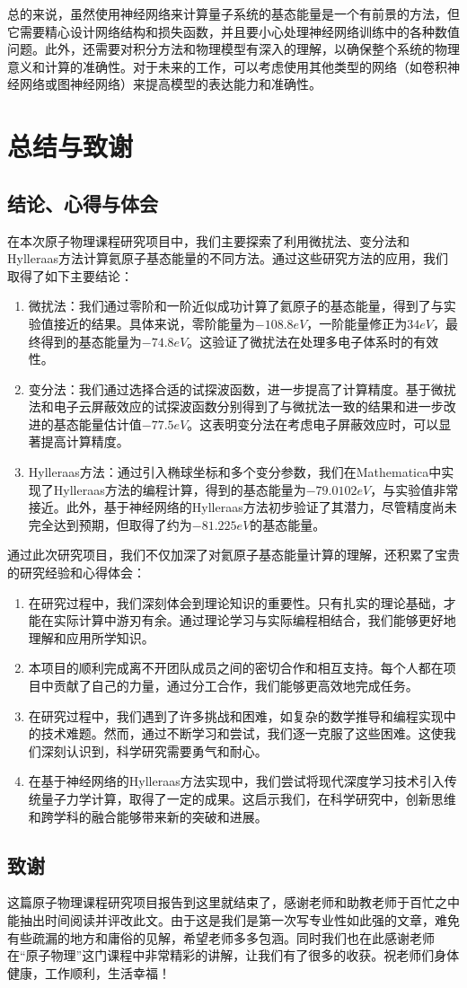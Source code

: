 总的来说，虽然使用神经网络来计算量子系统的基态能量是一个有前景的方法，但它需要精心设计网络结构和损失函数，并且要小心处理神经网络训练中的各种数值问题。此外，还需要对积分方法和物理模型有深入的理解，以确保整个系统的物理意义和计算的准确性。对于未来的工作，可以考虑使用其他类型的网络（如卷积神经网络或图神经网络）来提高模型的表达能力和准确性。

\section{总结与致谢}
\subsection{结论、心得与体会}
在本次原子物理课程研究项目中，我们主要探索了利用微扰法、变分法和Hylleraas方法计算氦原子基态能量的不同方法。通过这些研究方法的应用，我们取得了如下主要结论：
\begin{enumerate}
	\item 微扰法：我们通过零阶和一阶近似成功计算了氦原子的基态能量，得到了与实验值接近的结果。具体来说，零阶能量为$-108.8 eV$，一阶能量修正为$34 eV$，最终得到的基态能量为$-74.8 eV$。这验证了微扰法在处理多电子体系时的有效性。
	
	\item 变分法：我们通过选择合适的试探波函数，进一步提高了计算精度。基于微扰法和电子云屏蔽效应的试探波函数分别得到了与微扰法一致的结果和进一步改进的基态能量估计值$-77.5 eV$。这表明变分法在考虑电子屏蔽效应时，可以显著提高计算精度。
	
	\item Hylleraas方法：通过引入椭球坐标和多个变分参数，我们在Mathematica中实现了Hylleraas方法的编程计算，得到的基态能量为$-79.0102 eV$，与实验值非常接近。此外，基于神经网络的Hylleraas方法初步验证了其潜力，尽管精度尚未完全达到预期，但取得了约为$-81.225 eV$的基态能量。
\end{enumerate}

通过此次研究项目，我们不仅加深了对氦原子基态能量计算的理解，还积累了宝贵的研究经验和心得体会：	
\begin{enumerate}
	\item 在研究过程中，我们深刻体会到理论知识的重要性。只有扎实的理论基础，才能在实际计算中游刃有余。通过理论学习与实际编程相结合，我们能够更好地理解和应用所学知识。
	\item 本项目的顺利完成离不开团队成员之间的密切合作和相互支持。每个人都在项目中贡献了自己的力量，通过分工合作，我们能够更高效地完成任务。
	\item 在研究过程中，我们遇到了许多挑战和困难，如复杂的数学推导和编程实现中的技术难题。然而，通过不断学习和尝试，我们逐一克服了这些困难。这使我们深刻认识到，科学研究需要勇气和耐心。
	\item 在基于神经网络的Hylleraas方法实现中，我们尝试将现代深度学习技术引入传统量子力学计算，取得了一定的成果。这启示我们，在科学研究中，创新思维和跨学科的融合能够带来新的突破和进展。
\end{enumerate}

\subsection{致谢}
这篇原子物理课程研究项目报告到这里就结束了，感谢老师和助教老师于百忙之中能抽出时间阅读并评改此文。由于这是我们是第一次写专业性如此强的文章，难免有些疏漏的地方和庸俗的见解，希望老师多多包涵。同时我们也在此感谢老师在“原子物理”这门课程中非常精彩的讲解，让我们有了很多的收获。祝老师们身体健康，工作顺利，生活幸福！